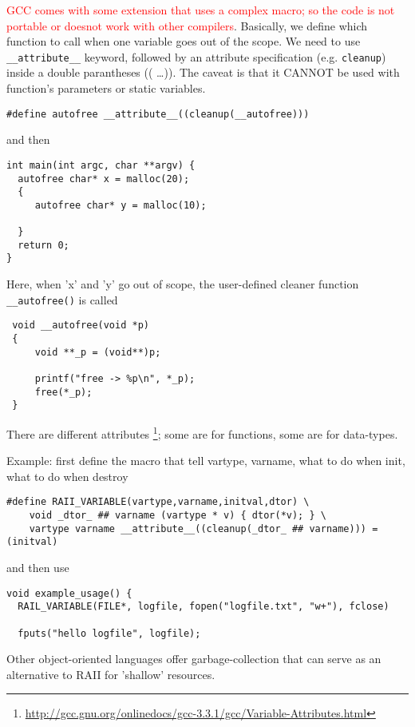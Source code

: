\textcolor{red}{GCC comes with some
extension that uses a complex macro; so the code is not portable or doesnot work
with other compilers}. Basically, we define which function to call when one
variable goes out of the scope. We need to use \verb!__attribute__!
keyword, followed by an attribute specification (e.g. \verb!cleanup!) inside a
double parantheses (( \ldots )). The caveat is that it CANNOT be used with
function's parameters or static variables. 

\begin{lstlisting}
#define autofree __attribute__((cleanup(__autofree)))  
\end{lstlisting}
and then 
\begin{lstlisting}
int main(int argc, char **argv) {
  autofree char* x = malloc(20);
  { 
     autofree char* y = malloc(10);
     
  }
  return 0;
}
\end{lstlisting}
Here, when 'x' and 'y' go out of scope, the user-defined cleaner function
\verb!__autofree()! is called
\begin{lstlisting}
 void __autofree(void *p)  
 {  
     void **_p = (void**)p;  
   
     printf("free -> %p\n", *_p);  
     free(*_p);  
 }  
\end{lstlisting}

There are different attributes
\footnote{\url{http://gcc.gnu.org/onlinedocs/gcc-3.3.1/gcc/Variable-Attributes.html}};
some are for functions, some are for data-types.

Example: first define the macro that tell vartype, varname, what to do when
init, what to do when destroy
\begin{lstlisting}
#define RAII_VARIABLE(vartype,varname,initval,dtor) \
    void _dtor_ ## varname (vartype * v) { dtor(*v); } \
    vartype varname __attribute__((cleanup(_dtor_ ## varname))) = (initval)
\end{lstlisting}
and then use
\begin{lstlisting}
void example_usage() {
  RAIL_VARIABLE(FILE*, logfile, fopen("logfile.txt", "w+"), fclose)
  
  fputs("hello logfile", logfile);
\end{lstlisting}


\begin{mdframed}
Other object-oriented languages offer garbage-collection that can serve as an
alternative to RAII for 'shallow' resources.
\end{mdframed}

